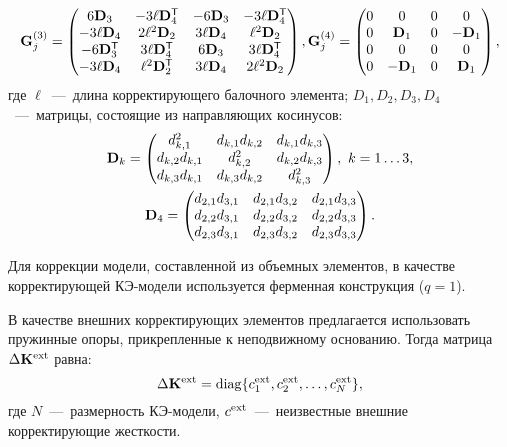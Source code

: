 \begin{equation*}
	\mathbf{G}_j^{(3)} =
	\begin{pmatrix}
		6 \mathbf{D}_3 & -3 \ell \mathbf{D} ^ \mathsf{T}_4 & -6 \mathbf{D}_3 & -3 \ell \mathbf{D} ^ \mathsf{T}_4 \\
		-3 \ell \mathbf{D}_4 & 2 \ell ^ 2 \mathbf{D}_2 & 3 \ell \mathbf{D}_4 & \ell ^ 2 \mathbf{D}_2 \\
		-6 \mathbf{D} ^ \mathsf{T}_3 & 3 \ell \mathbf{D} ^ \mathsf{T}_4 & 6 \mathbf{D}_3 & 3 \ell \mathbf{D} ^ \mathsf{T}_4 \\
		-3 \ell \mathbf{D}_4 & \ell ^ 2 \mathbf{D} ^ \mathsf{T}_2 & 3 \ell \mathbf{D}_4 & 2 \ell ^ 2 \mathbf{D}_2
	\end{pmatrix},
	\mathbf{G}_j^{(4)} =
	\begin{pmatrix}
		0 & 0 & 0 & 0 \\
		0 & \mathbf{D}_1 & 0 & -\mathbf{D}_1 \\
		0 & 0 & 0 & 0 \\
		0 & -\mathbf{D}_1 & 0 & \mathbf{D}_1 \\
	\end{pmatrix},
\end{equation*}
где $ \ell $~---~длина корректирующего балочного элемента; $ D_1, D_2, D_3, D_4 $~---~матрицы, состоящие из направляющих косинусов:
\begin{gather*}
	\mathbf{D}_k = 
	\begin{pmatrix}
		d_{k, 1}^2 & d_{k, 1} d_{k, 2} & d_{k, 1} d_{k, 3} \\
		d_{k, 2} d_{k, 1} & d_{k, 2} ^ 2 & d_{k, 2} d_{k, 3} \\
		d_{k, 3} d_{k, 1} & d_{k, 3} d_{k, 2} & d_{k, 3} ^ 2
	\end{pmatrix}, \ k = 1 \hdots 3, \\
	\mathbf{D}_4 = 
	\begin{pmatrix}
		d_{2, 1} d_{3, 1} & d_{2, 1} d_{3, 2} & d_{2, 1} d_{3, 3} \\
		d_{2, 2} d_{3, 1} & d_{2, 2} d_{3, 2} & d_{2, 2} d_{3, 3} \\
		d_{2, 3} d_{3, 1} & d_{2, 3} d_{3, 2} & d_{2, 3} d_{3, 3}
	\end{pmatrix}.
\end{gather*}

Для коррекции модели, составленной из объемных элементов, в качестве корректирующей КЭ-модели используется ферменная конструкция ($ q = 1 $). 

В качестве внешних корректирующих элементов предлагается использовать пружинные опоры, прикрепленные к неподвижному основанию. Тогда матрица $ \Delta \mathbf{K} ^ {\text{ext}} $ равна:
\begin{equation}
	\Delta \mathbf{K} ^ {\text{ext}} = \operatorname{diag} \{ c ^ {\text{ext}}_1, c ^ {\text{ext}}_2, \hdots, c ^ {\text{ext}}_N \},
\end{equation}
где $ N $~---~размерность КЭ-модели, $ c ^ {\text{ext}} $~---~неизвестные внешние корректирующие жесткости. 

